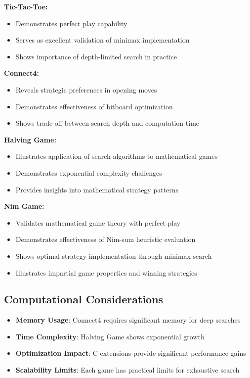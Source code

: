 \documentclass[12pt]{article}
\begin{document}
\textbf{Tic-Tac-Toe:}
\begin{itemize}
    \item Demonstrates perfect play capability
    \item Serves as excellent validation of minimax implementation
    \item Shows importance of depth-limited search in practice
\end{itemize}

\textbf{Connect4:}
\begin{itemize}
    \item Reveals strategic preferences in opening moves
    \item Demonstrates effectiveness of bitboard optimization
    \item Shows trade-off between search depth and computation time
\end{itemize}

\textbf{Halving Game:}
\begin{itemize}
    \item Illustrates application of search algorithms to mathematical games
    \item Demonstrates exponential complexity challenges
    \item Provides insights into mathematical strategy patterns
\end{itemize}

\textbf{Nim Game:}
\begin{itemize}
    \item Validates mathematical game theory with perfect play
    \item Demonstrates effectiveness of Nim-sum heuristic evaluation
    \item Shows optimal strategy implementation through minimax search
    \item Illustrates impartial game properties and winning strategies
\end{itemize}

\subsection{Computational Considerations}

\begin{itemize}
    \item \textbf{Memory Usage}: Connect4 requires significant memory for deep searches
    \item \textbf{Time Complexity}: Halving Game shows exponential growth
    \item \textbf{Optimization Impact}: C extensions provide significant performance gains
    \item \textbf{Scalability Limits}: Each game has practical limits for exhaustive search
\end{itemize}
\end{document}
